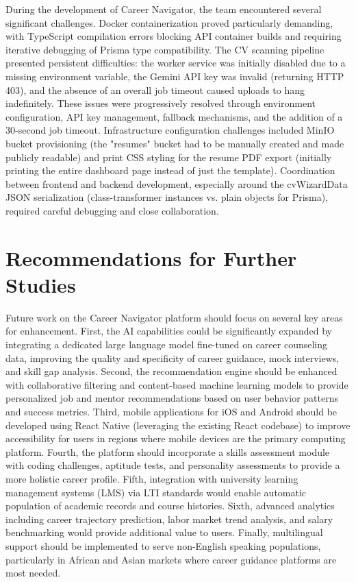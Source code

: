 \documentclass[12pt,a4paper]{report}
\begin{document}
During the development of Career Navigator, the team encountered several significant challenges. Docker containerization proved particularly demanding, with TypeScript compilation errors blocking API container builds and requiring iterative debugging of Prisma type compatibility. The CV scanning pipeline presented persistent difficulties: the worker service was initially disabled due to a missing environment variable, the Gemini API key was invalid (returning HTTP 403), and the absence of an overall job timeout caused uploads to hang indefinitely. These issues were progressively resolved through environment configuration, API key management, fallback mechanisms, and the addition of a 30-second job timeout. Infrastructure configuration challenges included MinIO bucket provisioning (the "resumes" bucket had to be manually created and made publicly readable) and print CSS styling for the resume PDF export (initially printing the entire dashboard page instead of just the template). Coordination between frontend and backend development, especially around the cvWizardData JSON serialization (class-transformer instances vs. plain objects for Prisma), required careful debugging and close collaboration.

\section{Recommendations for Further Studies}

Future work on the Career Navigator platform should focus on several key areas for enhancement. First, the AI capabilities could be significantly expanded by integrating a dedicated large language model fine-tuned on career counseling data, improving the quality and specificity of career guidance, mock interviews, and skill gap analysis. Second, the recommendation engine should be enhanced with collaborative filtering and content-based machine learning models to provide personalized job and mentor recommendations based on user behavior patterns and success metrics. Third, mobile applications for iOS and Android should be developed using React Native (leveraging the existing React codebase) to improve accessibility for users in regions where mobile devices are the primary computing platform. Fourth, the platform should incorporate a skills assessment module with coding challenges, aptitude tests, and personality assessments to provide a more holistic career profile. Fifth, integration with university learning management systems (LMS) via LTI standards would enable automatic population of academic records and course histories. Sixth, advanced analytics including career trajectory prediction, labor market trend analysis, and salary benchmarking would provide additional value to users. Finally, multilingual support should be implemented to serve non-English speaking populations, particularly in African and Asian markets where career guidance platforms are most needed.
\end{document}
